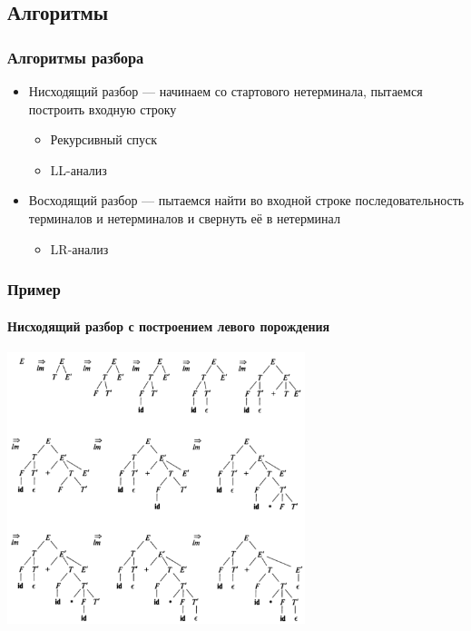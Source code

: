 \documentclass{../../slides-style}
\begin{document}
    \subsection{Алгоритмы}

    \begin{frame}
        \frametitle{Алгоритмы разбора}
        \begin{itemize}
            \item Нисходящий разбор --- начинаем со стартового нетерминала, пытаемся построить входную строку
            \begin{itemize}
                \item Рекурсивный спуск
                \item LL-анализ
            \end{itemize}
            \item Восходящий разбор --- пытаемся найти во входной строке последовательность терминалов и нетерминалов и свернуть её в нетерминал
            \begin{itemize}
                \item LR-анализ
            \end{itemize}
        \end{itemize}
    \end{frame}

    \begin{frame}
        \frametitle{Пример}
        \framesubtitle{Нисходящий разбор с построением левого порождения}
        \begin{center}
            \includegraphics[width=0.65\textwidth]{topDownAnalysis.png}
        \end{center}
    \end{frame}
\end{document}
